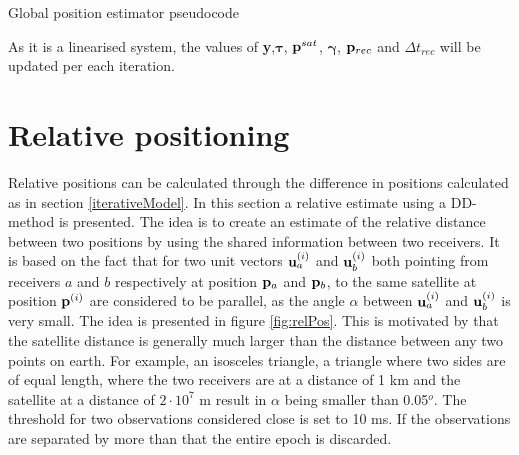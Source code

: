 \begin{algorithm}
\begin{algorithmic}
\ENDFOR
{}
\ENDFOR
{}
\ENDFOR
{}
\ENDFOR
{}
\ENDWHILE
\end{algorithmic}
\caption{\label{tab:pseudoCode} Global position estimator pseudocode}
\end{algorithm}
As it is a linearised system, the values of {\bf y},$\boldsymbol \tau$, ${\bf p}^{sat}$, $\boldsymbol \gamma$, ${\bf p}_{rec}$ and $\Delta t_{rec}$ will be updated per each iteration.
\section{Relative positioning}\label{RelPos}
Relative positions can be calculated through the difference in positions calculated as in section \ref{iterativeModel}. In this section a relative estimate using a DD-method is presented. The idea is to create an estimate of the relative distance between two positions by using the shared information between two receivers. It is based on the fact that for two unit vectors ${\bf u}^{(i)}_a$ and ${\bf u}^{(i)}_b$ both pointing from receivers $a$ and $b$ respectively at position ${\bf p}_a$ and ${\bf p}_b$, to the same satellite at position ${\bf p}^{(i)}$ are considered to be parallel, as the angle $\alpha$ between ${\bf u}^{(i)}_a$ and ${\bf u}^{(i)}_b$ is very small. The idea is presented in figure \ref{fig:relPos}. This is motivated by that the satellite distance is generally much larger than the distance between any two points on earth. For example, an isosceles triangle, a triangle where two sides are of equal length, where the two receivers are at a distance of 1 km and the satellite at a distance of $2\cdot 10^7$ m result in $\alpha$ being smaller than 0.05$^o$. The threshold for two observations considered close is set to 10 ms. If the observations are separated by more than that the entire epoch is discarded. 
